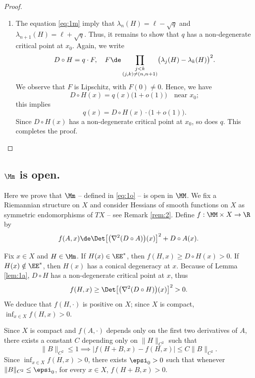 \begin{proof}
\begin{enumerate}
\item
The equation \eqref{eq:1m} imply that $\lambda_n(H) = \ell - \sqrt{q}$ and $\lambda_{n+1}(H) = \ell + \sqrt{q}$. Thus, it remains to show that $q$ has a non-degenerate critical point at $x_0$. Again, we write
\begin{equation*}
D \circ H = q \cdot F, \quad F \de \prod_{\substack{j < k \\ (j,k) \neq (n,n+1)}} \bigl(\lambda_j(H)-\lambda_k(H)\bigr)^2.
\end{equation*}
We observe that $F$ is Lipschitz, with $F(0) \neq 0$. Hence, we have
\[
D \circ H(x) = q(x) \bigl(1 + o(1)\bigr)\quad \text{near }x_0;
\]
this implies
\begin{equation*}
q(x) = D \circ H(x) \cdot \bigl( 1 + o(1) \bigr).
\end{equation*}
Since $D \circ H(x)$ has a non-degenerate critical point at $x_0$, so does $q$. This completes the proof.\qedhere
\end{enumerate}
\end{proof}

\subsection{$\Mm$ is open.}\label{sec:2.2} Here we prove that $\Mm$ -- defined in \eqref{eq:1o} -- is open in $\MM$. We fix a Riemannian structure on $X$ and consider Hessians of smooth functions on $X$ as symmetric endomorphisms of $TX$ -- see Remark \ref{rem:2}. Define $f : \MM \times X \to \R$ by
\begin{equation}\label{eq:0j}
f(A,x) \de \Det\bigl[ \bigl(\nabla^2 (D\circ A)\bigr)(x) \bigr]^2 + D \circ A(x).
\end{equation}

Fix $x \in X$ and $H \in \Mm$. If $H(x) \in \EE^*$, then $f(H,x) \geq D \circ H(x) > 0$. If $H(x) \notin \EE^*$, then $H(x)$ has a conical degeneracy at $x$. Because of Lemma \ref{lem:1a}, $D \circ H$ has a non-degenerate critical point at $x$, thus
\begin{equation*}
f(H,x) \geq \Det\bigl[ \bigl(\nabla^2 (D\circ H)\bigr)(x) \bigr]^2 > 0.
\end{equation*}
We deduce that $f(H,\cdot)$ is positive on $X$; since $X$ is compact, $\inf_{x \in X} f(H,x) > 0$.

Since $X$ is compact and $f(A,\cdot)$ depends only on the first two derivatives of $A$, there exists a constant $C$ depending only on $\| H \|_{C^2}$ such that
\begin{equation}\label{eq:0m}
\|B \|_{C^2} \leq 1 \implies
\big|f(H+B,x) - f(H,x)\big| \leq C \|B\|_{C^2}.
\end{equation}
Since $\inf_{x \in X} f(H,x) > 0$, there exists $\epsi_0 > 0$ such that whenever $\| B \|_{C^2} \leq \epsi_0$, for every $x \in X$, $f(H+B,x) > 0$.

